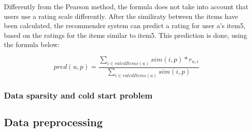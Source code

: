 Differently from the Pearson method, the formula does not take into account that users use a rating scale differently. 
After the similiraty between the items have been calculated, the recommender system can predict a rating for user a's item5, based on the ratings for the items similar to item5. This prediction is done, using the formula below:

\[
	pred(u,p) = \frac{\sum_{i\in ratedItems(u)} sim(i,p) * r_{u,i}}{\sum_{i \in ratedItems(a)} sim(i,p)}
\]

\subsubsection{Data sparsity and cold start problem}
\subsection{Data preprocessing} %
\label{sub:data_preprocessing}

